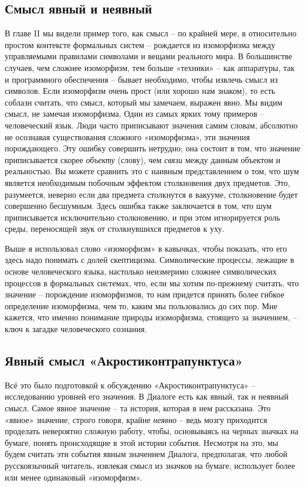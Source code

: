 \documentclass[../main.tex]{subfiles}
\begin{document}

\subsection{Смысл явный и неявный}

В главе II мы видели пример того, как смысл \--- по крайней мере, в относительно простом контексте формальных систем \--- рождается из изоморфизма между управляемыми правилами символами и вещами реального мира. В большинстве случаев, чем сложнее изоморфизм, тем больше «техники» \--- как аппаратуры, так и программного обеспечения \--- бывает необходимо, чтобы извлечь смысл из символов. Если изоморфизм очень прост (или хорошо нам знаком), то есть соблазн считать, что смысл, который мы замечаем, выражен явно. Мы видим смысл, не замечая изоморфизма. Один из самых ярких тому примеров \--- человеческий язык. Люди часто приписывают значения самим словам, абсолютно не осознавая существования сложного «изоморфизма», эти значения порождающего. Эту ошибку совершить нетрудно; она состоит в том, что значение приписывается скорее \emph{объекту} (слову), чем \emph{связи} между данным объектом и реальностью. Вы можете сравнить это с наивным представлением о том, что шум является необходимым побочным эффектом столкновения двух предметов. Это, разумеется, неверно если два предмета столкнутся в вакууме, столкновение будет совершенно бесшумным. Здесь ошибка также заключается в том, что шум приписывается исключительно столкновению, и при этом игнорируется роль среды, переносящей звук от столкнувшихся предметов к уху.

Выше я использовал слово «изоморфизм» в кавычках, чтобы показать, что его здесь надо понимать с долей скептицизма. Символические процессы, лежащие в основе человеческого языка, настолько неизмеримо сложнее символических процессов в формальных системах, что, если мы хотим по-прежнему считать, что значение \--- порождение изоморфизмов, то нам придется принять более гибкое определение изоморфизма, чем то, каким мы пользовались до сих пор. Мне кажется, что именно понимание природы изоморфизма, стоящего за значением, \--- ключ к загадке человеческого сознания.


\subsection{Явный смысл «Акростиконтрапунктуса»}

Всё это было подготовкой к обсуждению «Акростиконтрапунктуса» \--- исследованию уровней его значения. В Диалоге есть как явный, так и неявный смысл. Самое явное значение \--- та история, которая в нем рассказана. Это «явное» значение, строго говоря, крайне \emph{неявно} \--- ведь мозгу приходится проделать невероятно сложную работу, чтобы, основываясь на черных значках на бумаге, понять происходящие в этой истории события. Несмотря на это, мы будем считать эти события явным значением Диалога, предполагая, что любой русскоязычный читатель, извлекая смысл из значков на бумаге, использует более или менее одинаковый «изоморфизм».
\end{document}
